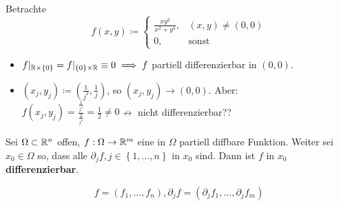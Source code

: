 \begin{example}
	Betrachte
	\[
		f(x, y) \coloneqq
		\begin{cases}
			\frac{ x y^2 }{ x^2 + y^4 } , & (x, y) \neq (0, 0) \\
			0, & \text{sonst} 
		\end{cases}
	\]
	\begin{itemize}
		\item $ f |_{\mathbb{R} \times \left\{ 0 \right\} } = f |_{\left\{ 0 \right\} \times \mathbb{R} } \equiv 0 \implies f $ partiell differenzierbar in $ (0, 0) $.
		\item $ (x_j, y_j) \coloneqq \left(\frac{ 1 }{ j^2 } , \frac{ 1 }{ j } \right) $, so
			$ (x_j, y_j) \to (0, 0) $.
			Aber:
			$ f(x_j, y_j) = \frac{\frac{ 1 }{ j^4 } }{ \frac{ 2 }{ j^4 }  } = \frac{ 1 }{ 2 } \neq 0 \nrightarrow $ nicht differenzierbar??
	\end{itemize}
\end{example}

\begin{theorem}
	Sei $ \Omega \subset \mathbb{R} ^n $ offen, $ f : \Omega \to \mathbb{R} ^m $ eine in $ \Omega $ partiell diffbare Funktion.
	Weiter sei $ x_0 \in \Omega $ so, dass alle $ \partial_j f, j \in \left\{ 1, \dotsc, n \right\}  $ in $ x_0 $  sind.
	Dann ist $ f $ in $ x_0 $ \textbf{differenzierbar}.
\end{theorem}

\[
	f = \left( f_1, \dotsc, f_n \right) , \partial_j f = \left( \partial_j f_1, \dotsc, \partial_j f_m \right) 
\]

